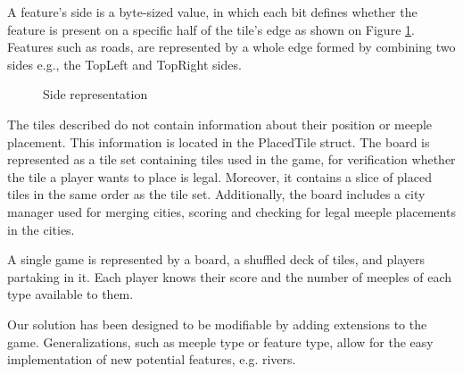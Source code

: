 A feature's side is a byte-sized value, in which each bit defines whether the feature is present on a specific half of the tile's edge as shown on Figure \ref{fig:SIDES}. Features such as roads, are represented by a whole edge formed by combining two sides e.g., the TopLeft and TopRight sides.
\begin{figure}
    \centering
    \caption{Side representation} \label{fig:SIDES}
\end{figure}

The tiles described do not contain information about their position or meeple placement. This information is located in the PlacedTile struct. The board is represented as a tile set containing tiles used in the game, for verification whether the tile a player wants to place is legal. Moreover, it contains a slice of placed tiles in the same order as the tile set. Additionally, the board includes a city manager used for merging cities, scoring and checking for legal meeple placements in the cities.

A single game is represented by a board, a shuffled deck of tiles, and players partaking in it. Each player knows their score and the number of meeples of each type available to them.

Our solution has been designed to be modifiable by adding extensions to the game. Generalizations, such as meeple type or feature type, allow for the easy implementation of new potential features, e.g. rivers.

